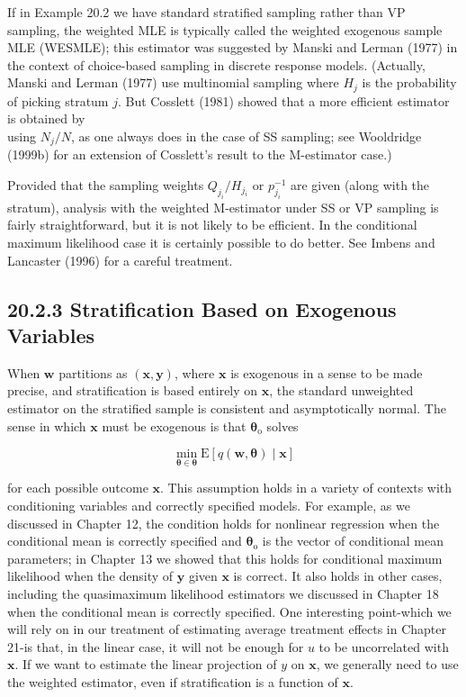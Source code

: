 \documentclass[10pt]{article}
\begin{document}
If in Example 20.2 we have standard stratified sampling rather than VP sampling, the weighted MLE is typically called the weighted exogenous sample MLE (WESMLE); this estimator was suggested by Manski and Lerman (1977) in the context of choice-based sampling in discrete response models. (Actually, Manski and Lerman (1977) use multinomial sampling where $H_{j}$ is the probability of picking stratum $j$. But Cosslett (1981) showed that a more efficient estimator is obtained by\\
using $N_{j} / N$, as one always does in the case of SS sampling; see Wooldridge (1999b) for an extension of Cosslett's result to the M-estimator case.)

Provided that the sampling weights $Q_{j_{i}} / H_{j_{i}}$ or $p_{j_{i}}^{-1}$ are given (along with the stratum), analysis with the weighted M-estimator under SS or VP sampling is fairly straightforward, but it is not likely to be efficient. In the conditional maximum likelihood case it is certainly possible to do better. See Imbens and Lancaster (1996) for a careful treatment.

\subsection*{20.2.3 Stratification Based on Exogenous Variables}
When $\mathbf{w}$ partitions as $(\mathbf{x}, \mathbf{y})$, where $\mathbf{x}$ is exogenous in a sense to be made precise, and stratification is based entirely on $\mathbf{x}$, the standard unweighted estimator on the stratified sample is consistent and asymptotically normal. The sense in which $\mathbf{x}$ must be exogenous is that $\boldsymbol{\theta}_{\mathrm{o}}$ solves


\begin{equation*}
\min _{\boldsymbol{\theta} \in \boldsymbol{\theta}} \mathrm{E}[q(\mathbf{w}, \boldsymbol{\theta}) \mid \mathbf{x}] \tag{20.15}
\end{equation*}


for each possible outcome $\mathbf{x}$. This assumption holds in a variety of contexts with conditioning variables and correctly specified models. For example, as we discussed in Chapter 12, the condition holds for nonlinear regression when the conditional mean is correctly specified and $\boldsymbol{\theta}_{\mathrm{o}}$ is the vector of conditional mean parameters; in Chapter 13 we showed that this holds for conditional maximum likelihood when the density of $\mathbf{y}$ given $\mathbf{x}$ is correct. It also holds in other cases, including the quasimaximum likelihood estimators we discussed in Chapter 18 when the conditional mean is correctly specified. One interesting point-which we will rely on in our treatment of estimating average treatment effects in Chapter 21-is that, in the linear case, it will not be enough for $u$ to be uncorrelated with $\mathbf{x}$. If we want to estimate the linear projection of $y$ on $\mathbf{x}$, we generally need to use the weighted estimator, even if stratification is a function of $\mathbf{x}$.
\end{document}
